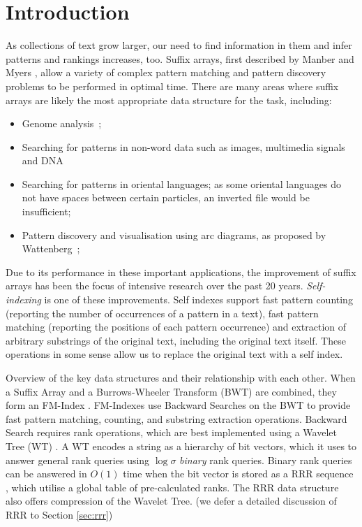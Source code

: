 \section{Introduction}

As collections of text grow larger, our need to find information in them
and infer patterns and rankings increases, too. Suffix arrays, first
described by Manber and Myers \cite{manber1993}, allow a variety of complex 
pattern matching and pattern discovery problems to be performed in optimal time. 
There are many areas where suffix arrays are likely the most appropriate data 
structure for the task, including:

\begin{itemize}
	\item
		Genome analysis~\cite{abouelhoda2004, flicek2009};
	\item
		Searching for patterns in non-word data such as images, multimedia 
		signals and DNA~\cite{culpepper2010}
	\item
		Searching for patterns in oriental languages; as some oriental languages
    	do not have spaces between certain particles, an inverted file would be
    	insufficient;
	\item
		Pattern discovery and visualisation using arc diagrams, as proposed by
    	Wattenberg~\cite{wattenberg2002};
\end{itemize}

Due to its performance in these important applications, the improvement of 
suffix arrays has been the focus of intensive research over the past 20 years. 
\emph{Self-indexing} is one of these improvements. Self indexes support 
fast pattern counting (reporting the number of occurrences of a pattern in a 
text), fast pattern matching (reporting the positions of each pattern 
occurrence) and extraction of arbitrary 
substrings of the original text, including the original text itself. These 
operations in some sense allow us to replace the original text with a self 
index.

	{Overview of the key data structures and their relationship
	with each other. When a Suffix Array and a Burrows-Wheeler 
	Transform (BWT) \cite{burrows1994} are combined, they form an FM-Index 
	\cite{ferragina2000}. FM-Indexes use 
	Backward Searches on the BWT to provide fast pattern 
	matching, counting, and substring extraction operations. Backward
	Search requires rank operations, which are best implemented using
	a Wavelet Tree (WT) \cite{grossi2003}. A WT encodes a string as a hierarchy 
	of bit vectors, 
	which it uses to answer general rank queries using $\log \sigma$ 
	\emph{binary} rank 
	queries. Binary rank queries can be answered in $O(1)$ time when the bit 
	vector is stored as a RRR sequence \cite{raman2007}, which utilise a global 
	table of pre-calculated ranks. The RRR data structure also offers 
	compression of the Wavelet Tree. (we defer a detailed discussion of RRR to
	Section \ref{sec:rrr})}

